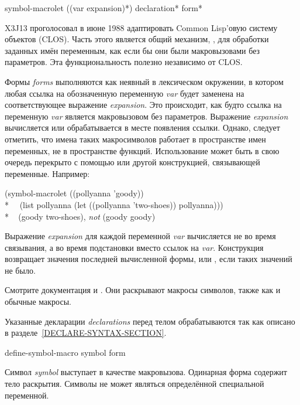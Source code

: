 \begin{defspec}
symbol-macrolet ({(var expansion)}*)
                {declaration}* {form}*

X3J13 проголосовал в июне 1988
адаптировать Common Lisp'овую систему объектов (CLOS). Часть этого является
общий механизм, , для обработки заданных имён переменным,
как если бы они были макровызовами без параметров. Эта функциональность
полезно независимо от CLOS.

Формы \emph{forms} выполняются как неявный  в лексическом окружении,
в котором любая ссылка на обозначенную переменную \emph{var} будет заменена на
соответствующее выражение \emph{expansion}. Это происходит, как будто ссылка на
переменную \emph{var} является макровызовом без параметров.
Выражение \emph{expansion} вычисляется или обрабатывается в месте появления
ссылки. Однако, следует отметить, что имена таких макросимволов работает в
пространстве имен переменных, не в пространстве функций. 
Использование  может быть в свою очередь перекрыто с
помощью  или другой конструкцией, связывающей переменные. Например:
\begin{lisp}
(symbol-macrolet ((pollyanna 'goody)) \\*
~~(list pollyanna (let ((pollyanna 'two-shoes)) pollyanna))) \\*
~{\EV} (goody two-shoes)\textrm{, \emph{not}} (goody goody)
\end{lisp}

Выражение \emph{expansion} для каждой переменной \emph{var} вычисляется не во
время связывания, а во время подстановки вместо ссылок на \emph{var}.
Конструкция возвращает значения последней вычисленной формы, или , если
таких значений не было.

Смотрите документация  и . Они раскрывают
макросы символов, также как и обычные макросы.

Указанные декларации \emph{declarations} перед телом обрабатываются так как
описано в разделе~\ref{DECLARE-SYNTAX-SECTION}.
\end{defspec}


\begin{defmac}
define-symbol-macro symbol {form}

Символ \emph{symbol} выступает в качестве макровызова. Одинарная форма содержит
тело раскрытия. Символы не может являться определённой специальной переменной.
\end{defmac}


